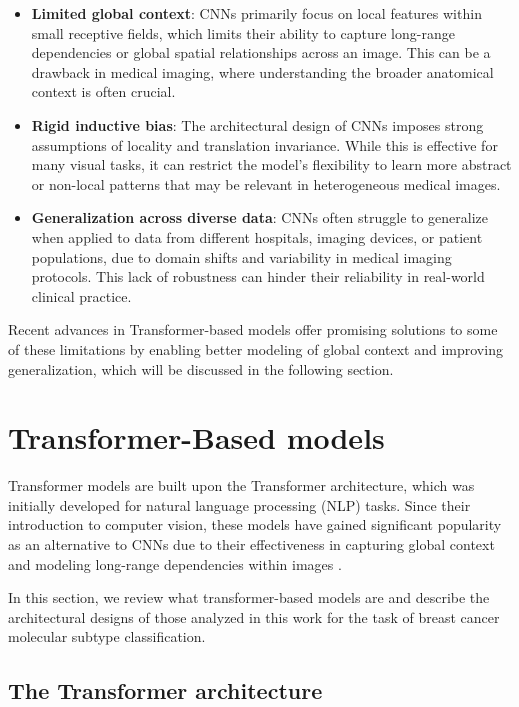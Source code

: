 \documentclass[a4paper,10pt]{book}
\begin{document}
\begin{itemize}
    \item \textbf{Limited global context}: CNNs primarily focus on local features within small receptive fields, which limits their ability to capture long-range dependencies or global spatial relationships across an image. This can be a drawback in medical imaging, where understanding the broader anatomical context is often crucial.
    
    \item \textbf{Rigid inductive bias}: The architectural design of CNNs imposes strong assumptions of locality and translation invariance. While this is effective for many visual tasks, it can restrict the model’s flexibility to learn more abstract or non-local patterns that may be relevant in heterogeneous medical images.
    
    \item \textbf{Generalization across diverse data}: CNNs often struggle to generalize when applied to data from different hospitals, imaging devices, or patient populations, due to domain shifts and variability in medical imaging protocols. This lack of robustness can hinder their reliability in real-world clinical practice.
\end{itemize}

Recent advances in Transformer-based models offer promising solutions to some of these limitations by enabling better modeling of global context and improving generalization, which will be discussed in the following section.

\section{Transformer-Based models}

Transformer models are built upon the Transformer architecture, which was initially developed for natural language processing (NLP) tasks. Since their introduction to computer vision, these models have gained significant popularity as an alternative to CNNs due to their effectiveness in capturing global context and modeling long-range dependencies within images \cite{pereira_review_2024}. 

In this section, we review what transformer-based models are and describe the architectural designs of those analyzed in this work for the task of breast cancer molecular subtype classification.

\subsection{The Transformer architecture}
\end{document}

